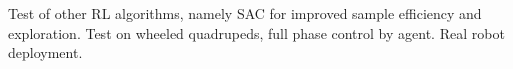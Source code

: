 \begin{Large}
	\vskip1cm
	Test of other RL algorithms, namely SAC for improved sample efficiency and exploration. Test on wheeled quadrupeds, full phase control by agent. Real robot deployment.\\
	\vskip2cm
\end{Large}